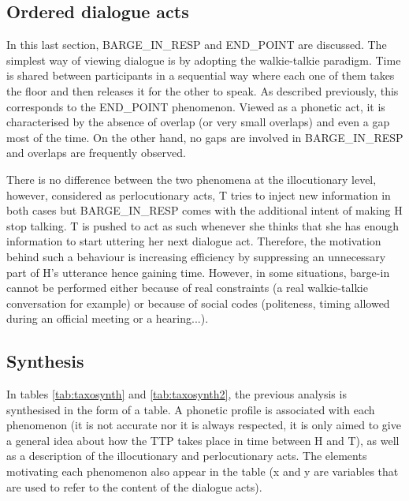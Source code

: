     \subsection{Ordered dialogue acts}

         In this last section, BARGE\_IN\_RESP and END\_POINT are discussed. The simplest way of viewing dialogue is by adopting the walkie-talkie paradigm. Time is shared between participants in a sequential way where each one of them takes the floor and then releases it for the other to speak. As described previously, this corresponds to the END\_POINT phenomenon. Viewed as a phonetic act, it is characterised by the absence of overlap (or very small overlaps) and even a gap most of the time. On the other hand, no gaps are involved in BARGE\_IN\_RESP and overlaps are frequently observed.

         There is no difference between the two phenomena at the illocutionary level, however, considered as perlocutionary acts, T tries to inject new information in both cases but BARGE\_IN\_RESP comes with the additional intent of making H stop talking. T is pushed to act as such whenever she thinks that she has enough information to start uttering her next dialogue act. Therefore, the motivation behind such a behaviour is increasing efficiency by suppressing an unnecessary part of H's utterance hence gaining time. However, in some situations, barge-in cannot be performed either because of real constraints (a real walkie-talkie conversation for example) or because of social codes (politeness, timing allowed during an official meeting or a hearing...).
				
		\subsection{Synthesis}
		
			In tables \ref{tab:taxosynth} and \ref{tab:taxosynth2}, the previous analysis is synthesised in the form of a table. A phonetic profile is associated with each phenomenon (it is not accurate nor it is always respected, it is only aimed to give a general idea about how the TTP takes place in time between H and T), as well as a description of the illocutionary and perlocutionary acts. The elements motivating each phenomenon also appear in the table (x and y are variables that are used to refer to the content of the dialogue acts).
		
